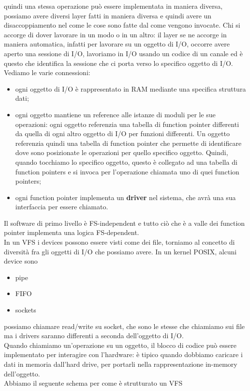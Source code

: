 \documentclass[12pt, oneside]{extbook}
\begin{document}
quindi una stessa operazione può essere implementata in maniera diversa, possiamo avere diversi layer fatti in maniera diversa e quindi avere un disaccoppiamento nel come le cose sono fatte dal come vengono invocate. Chi si accorge di dover lavorare in un modo o in un altro: il layer se ne accorge in maniera automatica, infatti per lavorare su un oggetto di I/O, occorre avere aperto una sessione di I/O, lavoriamo in I/O usando un codice di un canale ed è questo che identifica la sessione che ci porta verso lo specifico oggetto di I/O.\\Vediamo le varie connessioni:
\begin{itemize}
\item ogni oggetto di I/O è rappresentato in RAM mediante una specifica struttura dati;
\item ogni oggetto mantiene un reference alle istanze di moduli per le sue operazioni: ogni oggetto referenzia una tabella di function pointer differenti da quella di ogni altro oggetto di I/O per funzioni differenti. Un oggetto referenzia quindi una tabella di function pointer che permette di identificare dove sono posizionate le operazioni per quello specifico oggetto. Quindi, quando tocchiamo lo specifico oggetto, questo è collegato ad una tabella di function pointers e si invoca per l'operazione chiamata uno di quei function pointers;
\item ogni function pointer implementa un \textbf{driver} nel sistema, che avrà una sua interfaccia per essere chiamato.
\end{itemize}
Il software di primo livello è FS-independent e tutto ciò che è a valle dei function pointer implementa una logica FS-dependent.\\In un VFS i devices possono essere visti come dei file, torniamo al concetto di diversità fra gli oggetti di I/O che possiamo avere. In un kernel POSIX, alcuni device sono
\begin{itemize}
\item pipe
\item FIFO
\item sockets
\end{itemize} 
possiamo chiamare read/write su socket, che sono le stesse che chiamiamo sui file ma i drivers saranno differenti a seconda dell'oggetto di I/O.\\Quando chiamiamo un'operazione su un oggetto, il blocco di codice può essere implementato per interagire con l'hardware: è tipico quando dobbiamo caricare i dati in memoria dall'hard drive, per portarli nella rappresentazione in-memory dell'oggetto.\\Abbiamo il seguente schema per come è strutturato un VFS 
\end{document}
